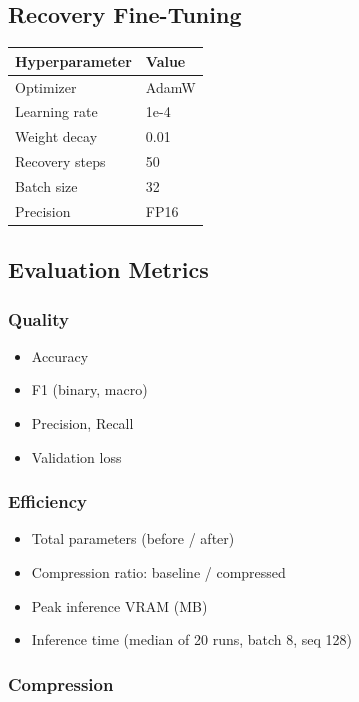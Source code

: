 \subsection{Recovery Fine-Tuning}

\begin{table}[H]
\centering
\small
\begin{tabular}{ll}
\toprule
\textbf{Hyperparameter} & \textbf{Value} \\
\midrule
Optimizer & AdamW \\
Learning rate & 1e-4 \\
Weight decay & 0.01 \\
Recovery steps & 50 \\
Batch size & 32 \\
Precision & FP16 \\
\bottomrule
\end{tabular}
\end{table}

\subsection{Evaluation Metrics}

\subsubsection{Quality}

\begin{itemize}
\item Accuracy
\item F1 (binary, macro)
\item Precision, Recall
\item Validation loss

\end{itemize}
\subsubsection{Efficiency}

\begin{itemize}
\item Total parameters (before / after)
\item Compression ratio: baseline / compressed
\item Peak inference VRAM (MB)
\item Inference time (median of 20 runs, batch 8, seq 128)

\end{itemize}
\subsubsection{Compression}

